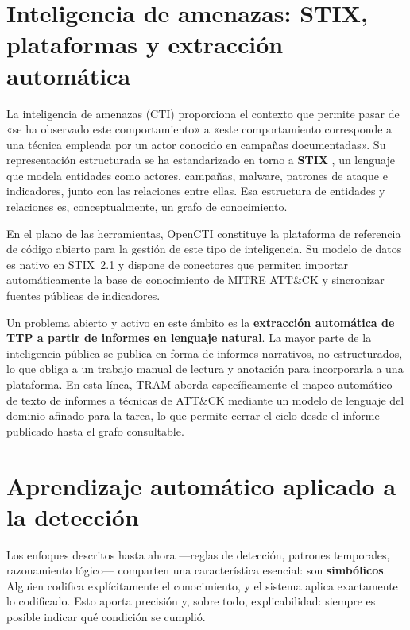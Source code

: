 
\section{Inteligencia de amenazas: STIX, plataformas y extracción automática}
\label{sec:cti}

La inteligencia de amenazas (CTI) proporciona el contexto que permite pasar de «se ha
observado este comportamiento» a «este comportamiento corresponde a una técnica empleada por
un actor conocido en campañas documentadas». Su representación estructurada se ha
estandarizado en torno a \textbf{STIX} \cite{stix}, un lenguaje que modela entidades como
actores, campañas, malware, patrones de ataque e indicadores, junto con las relaciones entre
ellas. Esa estructura de entidades y relaciones es, conceptualmente, un grafo de
conocimiento.

En el plano de las herramientas, OpenCTI \cite{opencti} constituye la plataforma de
referencia de código abierto para la gestión de este tipo de inteligencia. Su modelo de
datos es nativo en STIX~2.1 y dispone de conectores que permiten importar automáticamente la
base de conocimiento de MITRE ATT\&CK y sincronizar fuentes públicas de indicadores.

Un problema abierto y activo en este ámbito es la \textbf{extracción automática de TTP a
partir de informes en lenguaje natural}. La mayor parte de la inteligencia pública se publica
en forma de informes narrativos, no estructurados, lo que obliga a un trabajo manual de
lectura y anotación para incorporarla a una plataforma. En esta línea, TRAM
\cite{tram} aborda específicamente el mapeo automático de texto de informes a técnicas de
ATT\&CK mediante un modelo de lenguaje del dominio afinado para la tarea, lo que permite
cerrar el ciclo desde el informe publicado hasta el grafo consultable.

\section{Aprendizaje automático aplicado a la detección}
\label{sec:ml}

Los enfoques descritos hasta ahora —reglas de detección, patrones temporales, razonamiento
lógico— comparten una característica esencial: son \textbf{simbólicos}. Alguien codifica
explícitamente el conocimiento, y el sistema aplica exactamente lo codificado. Esto aporta
precisión y, sobre todo, explicabilidad: siempre es posible indicar qué condición se cumplió.

